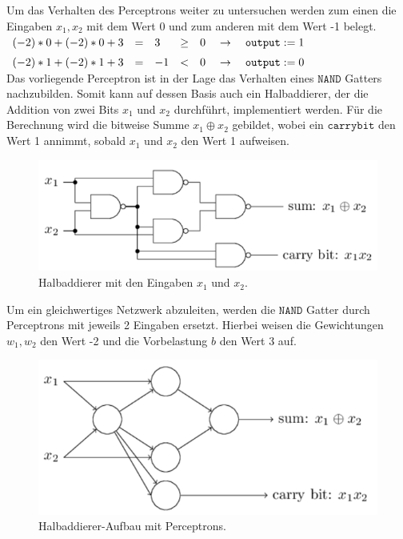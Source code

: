 \noindent
Um das Verhalten des Perceptrons weiter zu untersuchen werden zum einen die Eingaben $x_1, x_2$  mit dem Wert 0 und zum anderen mit dem Wert -1 belegt. \\[0.2cm]
\hspace*{1.3cm}
$
\begin{array}[t]{lclll}
	(-2)*0+(-2)*0+3 & = & 3 & \geq & 0  \quad\rightarrow\quad \mathtt{output} := 1 \\[0.2cm]
	(-2)*1+(-2)*1+3 & = & -1  & < & 0 \quad\rightarrow\quad \mathtt{output} := 0
\end{array}
$
\\[0.2cm]
Das vorliegende Perceptron ist in der Lage das Verhalten eines $\mathtt{NAND}$ Gatters nachzubilden. Somit kann auf dessen Basis auch ein Halbaddierer, der die Addition von zwei Bits $x_1$ und $x_2$ durchführt, implementiert werden. Für die Berechnung wird die bitweise Summe $x_1 \oplus x_2$ gebildet, wobei ein $\mathtt{carry bit}$ den Wert 1 annimmt, sobald $x_1$ und $x_2$ den Wert 1 aufweisen.
\begin{figure}[hbt]
	\centering
	\includegraphics[scale=0.6]{Bilder/nand_gatter}
	\caption{Halbaddierer mit den Eingaben $x_1$ und $x_2$.} 
	\label{fig:nand_gatter} 
\end{figure}

\noindent
Um ein gleichwertiges Netzwerk abzuleiten, werden die $\mathtt{NAND}$ Gatter durch Perceptrons mit jeweils 2 Eingaben ersetzt. Hierbei weisen die Gewichtungen $w_1, w_2$ den Wert -2 und die Vorbelastung $b$ den Wert 3 auf. 
\begin{figure}[hbt]
	\centering
	\includegraphics[scale=0.6]{Bilder/nand_gatter_perceptron}
	\caption{Halbaddierer-Aufbau mit Perceptrons.} 
	\label{fig:nand_gatter_perceptron} 
\end{figure}

